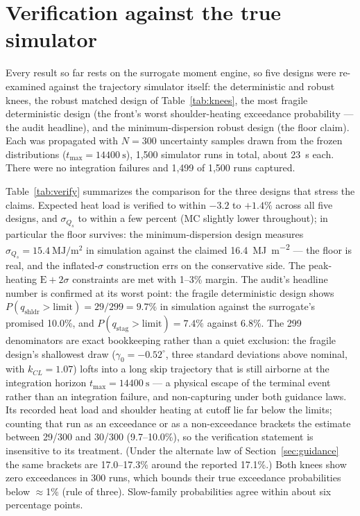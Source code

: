 \section{Verification against the true simulator}
\label{sec:verification}

Every result so far rests on the surrogate moment engine, so five designs
were re-examined against the trajectory simulator itself: the deterministic
and robust knees, the robust matched design of Table~\ref{tab:knees}, the
most fragile deterministic design (the front's worst shoulder-heating
exceedance probability --- the audit headline), and the minimum-dispersion
robust design (the floor claim). Each was propagated with $N=300$
uncertainty samples drawn from the frozen distributions
($t_{\max}=\SI{14400}{\s}$), 1{,}500 simulator runs in total, about 23~s
each. There were no integration failures and 1{,}499 of 1{,}500 runs
captured.

Table~\ref{tab:verify} summarizes the comparison for the three designs that
stress the claims. Expected heat load is verified to within $-3.2$ to
$+1.4\%$ across all five designs, and $\sigma_{Q_s}$ to within a few
percent (MC slightly lower throughout); in particular the floor survives:
the minimum-dispersion design measures $\sigma_{Q_s}=
\SI{15.4}{\mega\joule\per\square\metre}$ in simulation against the claimed
\SI{16.4}{\mega\joule\per\square\metre} --- the floor is real, and the
inflated-$\sigma$ construction errs on the conservative side. The
peak-heating $\mathrm{E}+2\sigma$ constraints are met with 1--3\%
margin. The audit's headline number is confirmed at its worst point: the
fragile deterministic design shows $P(q_{\mathrm{shldr}}>\text{limit})=
29/299=9.7\%$ in simulation against the surrogate's promised 10.0\%, and
$P(q_{\mathrm{stag}}>\text{limit})=7.4\%$ against 6.8\%. The 299
denominators are exact bookkeeping rather than a quiet exclusion: the
fragile design's shallowest draw ($\gamma_0=-0.52^\circ$, three standard
deviations above nominal, with $k_{CL}=1.07$) lofts into a long skip
trajectory that is still airborne at the integration horizon
$t_{\max}=\SI{14400}{\s}$ --- a physical escape of the terminal event
rather than an integration failure, and non-capturing under both
guidance laws. Its recorded heat load and shoulder heating at cutoff lie
far below the limits; counting that run as an exceedance or as a
non-exceedance brackets the estimate between 29/300 and 30/300
(9.7--10.0\%), so the verification statement is insensitive to its
treatment. (Under the alternate law of Section~\ref{sec:guidance} the
same brackets are 17.0--17.3\% around the reported 17.1\%.) Both knees
show zero exceedances in 300 runs, which bounds their true exceedance
probabilities below $\approx$1\% (rule of three). Slow-family
probabilities agree within about six percentage points.

